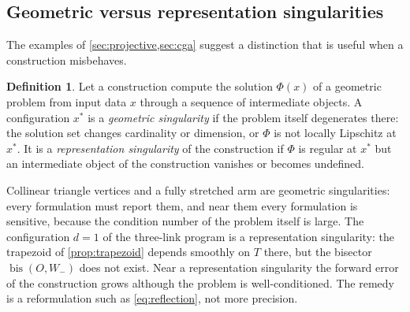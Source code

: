 \documentclass[11pt,a4paper]{article}
\theoremstyle{plain}
\theoremstyle{definition}
\newtheorem{definition}{Definition}
\theoremstyle{remark}
\newcommand{\bis}{\operatorname{bis}}
\begin{document}
\begin{center}
\end{center}

\subsection{Geometric versus representation singularities}\label{sec:singularities}

The examples of \cref{sec:projective,sec:cga} suggest a distinction that is
useful when a construction misbehaves.

\begin{definition}\label{def:singularities}
Let a construction compute the solution $\Phi(x)$ of a geometric problem from
input data $x$ through a sequence of intermediate objects. A configuration $x^*$
is a \emph{geometric singularity} if the problem itself degenerates there: the
solution set changes cardinality or dimension, or $\Phi$ is not locally
Lipschitz at $x^*$. It is a \emph{representation singularity} of the
construction if $\Phi$ is regular at $x^*$ but an intermediate object of the
construction vanishes or becomes undefined.
\end{definition}

Collinear triangle vertices and a fully stretched arm are geometric
singularities: every formulation must report them, and near them every
formulation is sensitive, because the condition number of the problem itself is
large. The configuration $d=1$ of the three-link program is a representation
singularity: the trapezoid of \cref{prop:trapezoid} depends smoothly on $T$
there, but the bisector $\bis(O,W_-)$ does not exist. Near a representation
singularity the forward error of the construction grows although the problem is
well-conditioned. The remedy is a reformulation such as \cref{eq:reflection},
not more precision.
\end{document}
